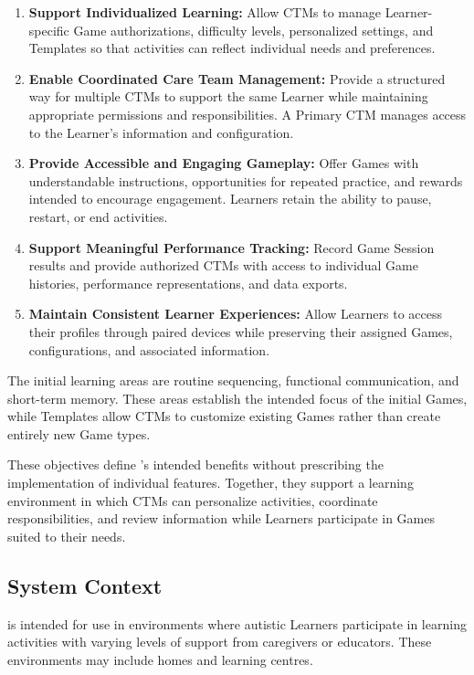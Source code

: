 \documentclass[12pt]{article}
\begin{document}
\begin{enumerate}
\item \textbf{Support Individualized Learning:} Allow CTMs to manage
Learner-specific Game authorizations, difficulty levels, personalized settings,
and Templates so that activities can reflect individual needs and preferences.
\item \textbf{Enable Coordinated Care Team Management:} Provide a structured way
for multiple CTMs to support the same Learner while maintaining appropriate
permissions and responsibilities. A Primary CTM manages access to the Learner's
information and configuration.
\item \textbf{Provide Accessible and Engaging Gameplay:} Offer Games with
understandable instructions, opportunities for repeated practice, and rewards
intended to encourage engagement. Learners retain the ability to pause, restart,
or end activities.
\item \textbf{Support Meaningful Performance Tracking:} Record Game Session
results and provide authorized CTMs with access to individual Game histories,
performance representations, and data exports.
\item \textbf{Maintain Consistent Learner Experiences:} Allow Learners to access
their profiles through paired devices while preserving their assigned Games,
configurations, and associated information.
\end{enumerate}

The initial learning areas are routine sequencing, functional communication, and
short-term memory. These areas establish the intended focus of the initial
Games, while Templates allow CTMs to customize existing Games rather than create
entirely new Game types.

These objectives define \progname{}'s intended benefits without prescribing the
implementation of individual features. Together, they support a learning
environment in which CTMs can personalize activities, coordinate
responsibilities, and review information while Learners participate in Games
suited to their needs.

\subsection{System Context} \label{sec_SystemContext}

\progname{} is intended for use in environments where autistic Learners
participate in learning activities with varying levels of support from
caregivers or educators. These environments may include homes and learning
centres.
\end{document}
